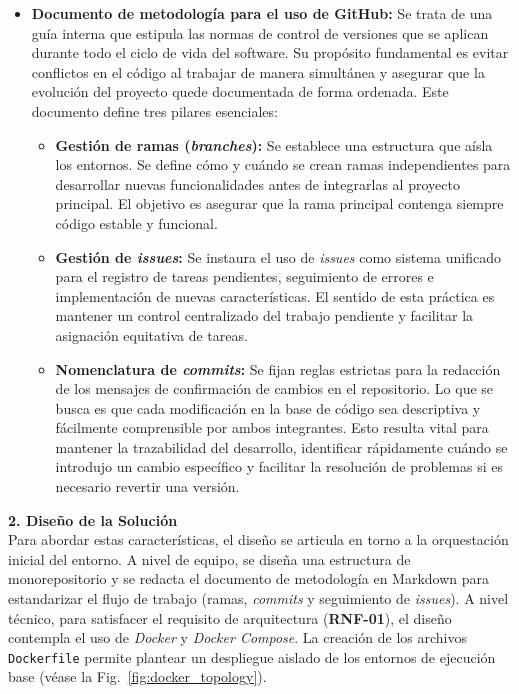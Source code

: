 \begin{itemize}
    \item \textbf{Documento de metodología para el uso de GitHub:} Se trata de una guía interna que estipula las normas de control de versiones que se aplican durante todo el ciclo de vida del software. Su propósito fundamental es evitar conflictos en el código al trabajar de manera simultánea y asegurar que la evolución del proyecto quede documentada de forma ordenada. Este documento define tres pilares esenciales:
    \begin{itemize}
        \item \textbf{Gestión de ramas (\textit{branches}):} Se establece una estructura que aísla los entornos. Se define cómo y cuándo se crean ramas independientes para desarrollar nuevas funcionalidades antes de integrarlas al proyecto principal. El objetivo es asegurar que la rama principal contenga siempre código estable y funcional.
        \item \textbf{Gestión de \textit{issues}:} Se instaura el uso de \textit{issues} como sistema unificado para el registro de tareas pendientes, seguimiento de errores e implementación de nuevas características. El sentido de esta práctica es mantener un control centralizado del trabajo pendiente y facilitar la asignación equitativa de tareas.
        \item \textbf{Nomenclatura de \textit{commits}:} Se fijan reglas estrictas para la redacción de los mensajes de confirmación de cambios en el repositorio. Lo que se busca es que cada modificación en la base de código sea descriptiva y fácilmente comprensible por ambos integrantes. Esto resulta vital para mantener la trazabilidad del desarrollo, identificar rápidamente cuándo se introdujo un cambio específico y facilitar la resolución de problemas si es necesario revertir una versión.
    \end{itemize}
\end{itemize}

\textbf{2. Diseño de la Solución} \\
Para abordar estas características, el diseño se articula en torno a la orquestación inicial del entorno. A nivel de equipo, se diseña una estructura de monorepositorio y se redacta el documento de metodología en Markdown para estandarizar el flujo de trabajo (ramas, \textit{commits} y seguimiento de \textit{issues}). A nivel técnico, para satisfacer el requisito de arquitectura (\textbf{RNF-01}), el diseño contempla el uso de \textit{Docker} y \textit{Docker Compose}. La creación de los archivos \texttt{Dockerfile} permite plantear un despliegue aislado de los entornos de ejecución base (véase la Fig.~\ref{fig:docker_topology}).

